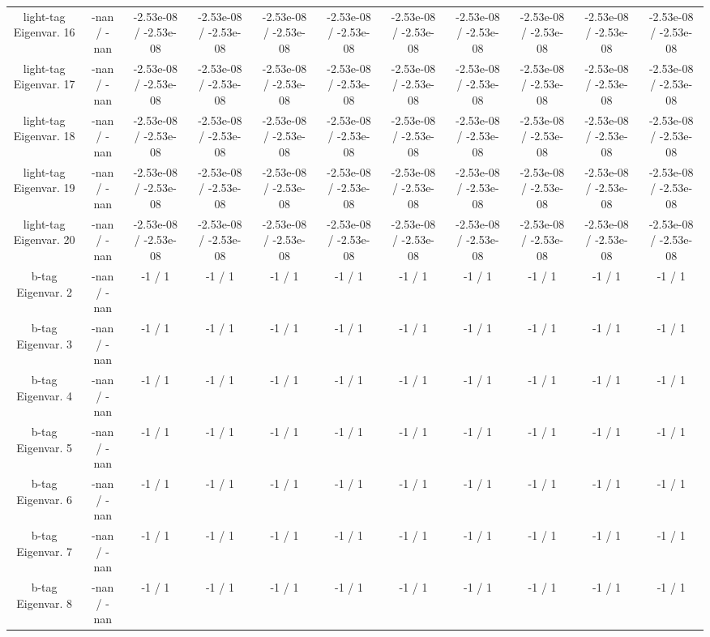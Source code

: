 \begin{table}[htbp]
\begin{center}
\begin{tabular}{|c|c|c|c|c|c|c|c|c|c|c|}
  light-tag Eigenvar. 16 & -nan / -nan & -2.53e-08 / -2.53e-08 & -2.53e-08 / -2.53e-08 & -2.53e-08 / -2.53e-08 & -2.53e-08 / -2.53e-08 & -2.53e-08 / -2.53e-08 & -2.53e-08 / -2.53e-08 & -2.53e-08 / -2.53e-08 & -2.53e-08 / -2.53e-08 & -2.53e-08 / -2.53e-08 \\ 
  light-tag Eigenvar. 17 & -nan / -nan & -2.53e-08 / -2.53e-08 & -2.53e-08 / -2.53e-08 & -2.53e-08 / -2.53e-08 & -2.53e-08 / -2.53e-08 & -2.53e-08 / -2.53e-08 & -2.53e-08 / -2.53e-08 & -2.53e-08 / -2.53e-08 & -2.53e-08 / -2.53e-08 & -2.53e-08 / -2.53e-08 \\ 
  light-tag Eigenvar. 18 & -nan / -nan & -2.53e-08 / -2.53e-08 & -2.53e-08 / -2.53e-08 & -2.53e-08 / -2.53e-08 & -2.53e-08 / -2.53e-08 & -2.53e-08 / -2.53e-08 & -2.53e-08 / -2.53e-08 & -2.53e-08 / -2.53e-08 & -2.53e-08 / -2.53e-08 & -2.53e-08 / -2.53e-08 \\ 
  light-tag Eigenvar. 19 & -nan / -nan & -2.53e-08 / -2.53e-08 & -2.53e-08 / -2.53e-08 & -2.53e-08 / -2.53e-08 & -2.53e-08 / -2.53e-08 & -2.53e-08 / -2.53e-08 & -2.53e-08 / -2.53e-08 & -2.53e-08 / -2.53e-08 & -2.53e-08 / -2.53e-08 & -2.53e-08 / -2.53e-08 \\ 
  light-tag Eigenvar. 20 & -nan / -nan & -2.53e-08 / -2.53e-08 & -2.53e-08 / -2.53e-08 & -2.53e-08 / -2.53e-08 & -2.53e-08 / -2.53e-08 & -2.53e-08 / -2.53e-08 & -2.53e-08 / -2.53e-08 & -2.53e-08 / -2.53e-08 & -2.53e-08 / -2.53e-08 & -2.53e-08 / -2.53e-08 \\ 
  b-tag Eigenvar. 2 & -nan / -nan & -1 / 1 & -1 / 1 & -1 / 1 & -1 / 1 & -1 / 1 & -1 / 1 & -1 / 1 & -1 / 1 & -1 / 1 \\ 
  b-tag Eigenvar. 3 & -nan / -nan & -1 / 1 & -1 / 1 & -1 / 1 & -1 / 1 & -1 / 1 & -1 / 1 & -1 / 1 & -1 / 1 & -1 / 1 \\ 
  b-tag Eigenvar. 4 & -nan / -nan & -1 / 1 & -1 / 1 & -1 / 1 & -1 / 1 & -1 / 1 & -1 / 1 & -1 / 1 & -1 / 1 & -1 / 1 \\ 
  b-tag Eigenvar. 5 & -nan / -nan & -1 / 1 & -1 / 1 & -1 / 1 & -1 / 1 & -1 / 1 & -1 / 1 & -1 / 1 & -1 / 1 & -1 / 1 \\ 
  b-tag Eigenvar. 6 & -nan / -nan & -1 / 1 & -1 / 1 & -1 / 1 & -1 / 1 & -1 / 1 & -1 / 1 & -1 / 1 & -1 / 1 & -1 / 1 \\ 
  b-tag Eigenvar. 7 & -nan / -nan & -1 / 1 & -1 / 1 & -1 / 1 & -1 / 1 & -1 / 1 & -1 / 1 & -1 / 1 & -1 / 1 & -1 / 1 \\ 
  b-tag Eigenvar. 8 & -nan / -nan & -1 / 1 & -1 / 1 & -1 / 1 & -1 / 1 & -1 / 1 & -1 / 1 & -1 / 1 & -1 / 1 & -1 / 1 \\ 

\end{tabular}
\end{center}
\end{table}
